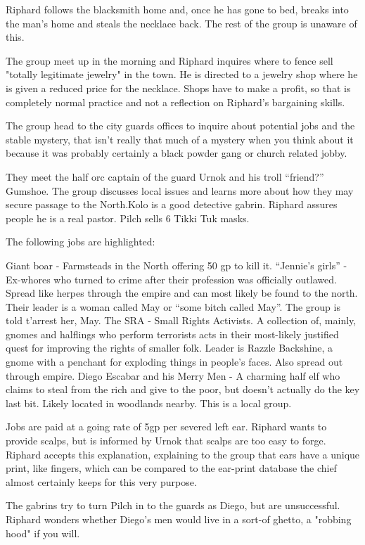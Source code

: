 Riphard follows the blacksmith home and, once he has gone to bed, breaks into the man’s home and steals the necklace back. The rest of the group is unaware of this.

The group meet up in the morning and Riphard inquires where to fence sell "totally legitimate jewelry" in the town. He is directed to a jewelry shop where he is given a reduced price for the necklace. Shops have to make a profit, so that is completely normal practice and not a reflection on Riphard's bargaining skills.

The group head to the city guards offices to inquire about potential jobs and the stable mystery, that isn’t really that much of a mystery when you think about it because it was probably certainly a black powder gang or church related jobby.

They meet the half orc captain of the guard Urnok and his troll “friend?” Gumshoe. The group discusses local issues and learns more about how they may secure passage to the North.Kolo is a good detective gabrin. Riphard assures people he is a real pastor. Pilch sells 6 Tikki Tuk masks.

The following jobs are highlighted:

    Giant boar - Farmsteads in the North offering 50 gp to kill it.
    “Jennie’s girls” - Ex-whores who turned to crime after their profession was officially outlawed. Spread like herpes through the empire and can most likely be found to the north. Their leader is a woman called May or “some bitch called May”. The group is told t'arrest her, May.
    The SRA - Small Rights Activists. A collection of, mainly, gnomes and halflings who perform terrorists acts in their most-likely justified quest for improving the rights of smaller folk. Leader is Razzle Backshine, a gnome with a penchant for exploding things in people’s faces. Also spread out through empire.
    Diego Escabar and his Merry Men - A charming half elf who claims to steal from the rich and give to the poor, but doesn’t actually do the key last bit. Likely located in woodlands nearby. This is a local group.

Jobs are paid at a going rate of 5gp per severed left ear. Riphard wants to provide scalps, but is informed by Urnok that scalps are too easy to forge. Riphard accepts this explanation, explaining to the group that ears have a unique print, like fingers, which can be compared to the ear-print database the chief almost certainly keeps for this very purpose.

The gabrins try to turn Pilch in to the guards as Diego, but are unsuccessful. Riphard wonders whether Diego's men would live in a sort-of ghetto, a "robbing hood" if you will.

